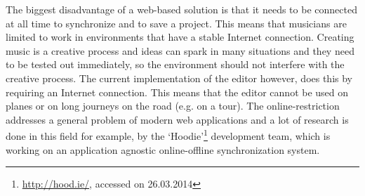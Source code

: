The biggest disadvantage of a web-based solution is that it needs to be connected at all  time to synchronize and to save a project. This means that musicians are limited to work in environments that have a stable Internet connection. Creating music is a creative process and ideas can spark in many situations and they need to be tested out immediately, so the environment should not interfere with the creative process. The current implementation of the editor however, does this by requiring an Internet connection. This means that the editor cannot be used on planes or on long journeys on the road (e.g. on a tour). The online-restriction addresses a general problem of modern web applications and a lot of research is done in this field for example, by the `Hoodie'\footnote{\url{http://hood.ie/}, accessed on 26.03.2014} development team, which is working on an application agnostic online-offline synchronization system.